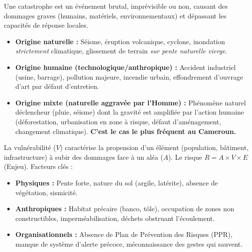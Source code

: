 \documentclass[11pt]{article}
\newcounter{popsec}
\newcounter{popsub}
\newcommand{\courssub}[1]{%
  \stepcounter{popsub}%
  \par\vspace{9pt}\noindent{\popxbold\fontsize{11.5}{13}\selectfont\color{popink}{\color{poporange}\thepopsec.\thepopsub}\hspace{6pt}#1}\par\nopagebreak\vspace{4pt}
}
\begin{document}
\courssub{Ressources à mobiliser}
\begin{propriete}
Une catastrophe est un événement brutal, imprévisible ou non, causant des dommages graves (humains, matériels, environnementaux) et dépassant les capacités de réponse locales.
\begin{itemize}
    \item \textbf{Origine naturelle :} Séisme, éruption volcanique, cyclone, inondation \emph{strictement} climatique, glissement de terrain \emph{sur pente naturelle vierge}.
    \item \textbf{Origine humaine (technologique/anthropique) :} Accident industriel (usine, barrage), pollution majeure, incendie urbain, effondrement d'ouvrage d'art par défaut d'entretien.
    \item \textbf{Origine mixte (naturelle aggravée par l'Homme) :} Phénomène naturel déclencheur (pluie, séisme) dont la gravité est amplifiée par l'action humaine (déforestation, urbanisation en zone à risque, défaut d'aménagement, changement climatique). \textbf{C'est le cas le plus fréquent au Cameroun.}
\end{itemize}
\end{propriete}

\begin{propriete}
La vulnérabilité ($V$) caractérise la propension d'un élément (population, bâtiment, infrastructure) à subir des dommages face à un aléa ($A$). Le risque $R = A \times V \times E$ (Enjeu). Facteurs clés :
\begin{itemize}
    \item \textbf{Physiques :} Pente forte, nature du sol (argile, latérite), absence de végétation, sismicité.
    \item \textbf{Anthropiques :} Habitat précaire (banco, tôle), occupation de zones non constructibles, imperméabilisation, déchets obstruant l'écoulement.
    \item \textbf{Organisationnels :} Absence de Plan de Prévention des Risques (PPR), manque de système d'alerte précoce, méconnaissance des gestes qui sauvent.
\end{itemize}
\end{propriete}
\end{document}
